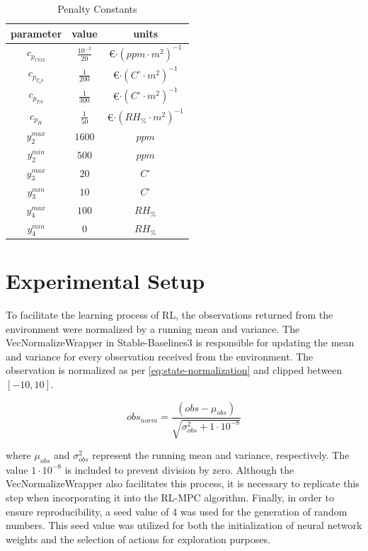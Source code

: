 \begin{table}[h]
    \centering
    \begin{tabular}{|c|c|c|}
    \hline
         parameter& value & units  \\
    \hline
        $c_{p_{\text{CO2}}}$ &$\frac{10^{-3}}{20}$ & \euro$\cdot (ppm \cdot m^2)^{-1}$ \\
        $c_{p_{T_ub}}$ & $\frac{1}{200}$& \euro$\cdot (C^{\circ} \cdot m^2)^{-1}$\\
        $c_{p_{T_lb}}$ & $\frac{1}{300}$& \euro$\cdot (C^{\circ} \cdot m^2)^{-1}$\\
        $c_{p_{H}}$ & $\frac{1}{50}$ & \euro$\cdot (RH_{\%} \cdot m^2)^{-1}$\\
        $y_2^{max}$ & $1600$ & $ppm$ \\
        $y_2^{min}$ & $500$ & $ppm$ \\
        $y_3^{max}$ & $20$ & $C^{\circ}$ \\
        $y_3^{min}$ & $10$ & $C^{\circ}$ \\
        $y_4^{max}$ & $100$ & $RH_{\%}$ \\
        $y_4^{min}$ & $0$ & $RH_{\%}$ \\       
        \hline
    \end{tabular}
    \caption{Penalty Constants}
    \label{tab:pen-constants}
\end{table}



\section{Experimental Setup} \label{section:experimental-setup}


To facilitate the learning process of RL, the observations returned from the environment were normalized by a running mean and variance. The VecNormalizeWrapper in Stable-Baselines3 is responsible for updating the mean and variance for every observation received from the environment. The observation is normalized as per \autoref{eq:state-normalization} and clipped between $[-10,10]$.

\begin{equation}\label{eq:state-normalization}
    obs_{norm} = \frac{(obs - \mu_{obs}) }{\sqrt{\sigma^2_{obs} + 1\cdot 10^{-8}}}
\end{equation}

where $\mu_{obs}$ and $\sigma^2_{obs}$ represent the running mean and variance, respectively. The value $1\cdot 10^{-8}$ is included to prevent division by zero. Although the VecNormalizeWrapper also facilitates this process, it is necessary to replicate this step when incorporating it into the RL-MPC algorithm. Finally, in order to ensure reproducibility, a seed value of 4 was used for the generation of random numbers.
This seed value was utilized for both the initialization of neural network weights and the selection of actions for exploration purposes.

